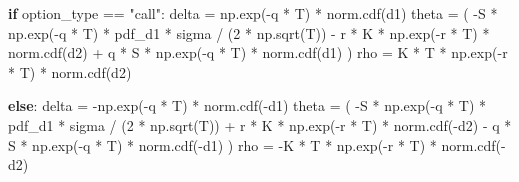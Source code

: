 \documentclass[
  11pt,
]{article}
\newenvironment{Shaded}{}{}
\newcommand{\ControlFlowTok}[1]{\textcolor[rgb]{0.00,0.44,0.13}{\textbf{#1}}}
\newcommand{\DecValTok}[1]{\textcolor[rgb]{0.25,0.63,0.44}{#1}}
\newcommand{\NormalTok}[1]{#1}
\newcommand{\OperatorTok}[1]{\textcolor[rgb]{0.40,0.40,0.40}{#1}}
\newcommand{\StringTok}[1]{\textcolor[rgb]{0.25,0.44,0.63}{#1}}
\begin{document}
\begin{Shaded}
\begin{Highlighting}[]
    \ControlFlowTok{if}\NormalTok{ option\_type }\OperatorTok{==} \StringTok{"call"}\NormalTok{:}
\NormalTok{        delta }\OperatorTok{=}\NormalTok{ np.exp(}\OperatorTok{{-}}\NormalTok{q }\OperatorTok{*}\NormalTok{ T) }\OperatorTok{*}\NormalTok{ norm.cdf(d1)}
\NormalTok{        theta }\OperatorTok{=}\NormalTok{ (}
            \OperatorTok{{-}}\NormalTok{S }\OperatorTok{*}\NormalTok{ np.exp(}\OperatorTok{{-}}\NormalTok{q }\OperatorTok{*}\NormalTok{ T) }\OperatorTok{*}\NormalTok{ pdf\_d1 }\OperatorTok{*}\NormalTok{ sigma }\OperatorTok{/}\NormalTok{ (}\DecValTok{2} \OperatorTok{*}\NormalTok{ np.sqrt(T))}
            \OperatorTok{{-}}\NormalTok{ r }\OperatorTok{*}\NormalTok{ K }\OperatorTok{*}\NormalTok{ np.exp(}\OperatorTok{{-}}\NormalTok{r }\OperatorTok{*}\NormalTok{ T) }\OperatorTok{*}\NormalTok{ norm.cdf(d2)}
            \OperatorTok{+}\NormalTok{ q }\OperatorTok{*}\NormalTok{ S }\OperatorTok{*}\NormalTok{ np.exp(}\OperatorTok{{-}}\NormalTok{q }\OperatorTok{*}\NormalTok{ T) }\OperatorTok{*}\NormalTok{ norm.cdf(d1)}
\NormalTok{        )}
\NormalTok{        rho }\OperatorTok{=}\NormalTok{ K }\OperatorTok{*}\NormalTok{ T }\OperatorTok{*}\NormalTok{ np.exp(}\OperatorTok{{-}}\NormalTok{r }\OperatorTok{*}\NormalTok{ T) }\OperatorTok{*}\NormalTok{ norm.cdf(d2)}

    \ControlFlowTok{else}\NormalTok{:}
\NormalTok{        delta }\OperatorTok{=} \OperatorTok{{-}}\NormalTok{np.exp(}\OperatorTok{{-}}\NormalTok{q }\OperatorTok{*}\NormalTok{ T) }\OperatorTok{*}\NormalTok{ norm.cdf(}\OperatorTok{{-}}\NormalTok{d1)}
\NormalTok{        theta }\OperatorTok{=}\NormalTok{ (}
            \OperatorTok{{-}}\NormalTok{S }\OperatorTok{*}\NormalTok{ np.exp(}\OperatorTok{{-}}\NormalTok{q }\OperatorTok{*}\NormalTok{ T) }\OperatorTok{*}\NormalTok{ pdf\_d1 }\OperatorTok{*}\NormalTok{ sigma }\OperatorTok{/}\NormalTok{ (}\DecValTok{2} \OperatorTok{*}\NormalTok{ np.sqrt(T))}
            \OperatorTok{+}\NormalTok{ r }\OperatorTok{*}\NormalTok{ K }\OperatorTok{*}\NormalTok{ np.exp(}\OperatorTok{{-}}\NormalTok{r }\OperatorTok{*}\NormalTok{ T) }\OperatorTok{*}\NormalTok{ norm.cdf(}\OperatorTok{{-}}\NormalTok{d2)}
            \OperatorTok{{-}}\NormalTok{ q }\OperatorTok{*}\NormalTok{ S }\OperatorTok{*}\NormalTok{ np.exp(}\OperatorTok{{-}}\NormalTok{q }\OperatorTok{*}\NormalTok{ T) }\OperatorTok{*}\NormalTok{ norm.cdf(}\OperatorTok{{-}}\NormalTok{d1)}
\NormalTok{        )}
\NormalTok{        rho }\OperatorTok{=} \OperatorTok{{-}}\NormalTok{K }\OperatorTok{*}\NormalTok{ T }\OperatorTok{*}\NormalTok{ np.exp(}\OperatorTok{{-}}\NormalTok{r }\OperatorTok{*}\NormalTok{ T) }\OperatorTok{*}\NormalTok{ norm.cdf(}\OperatorTok{{-}}\NormalTok{d2)}


\end{Highlighting}
\end{Shaded}
\end{document}

